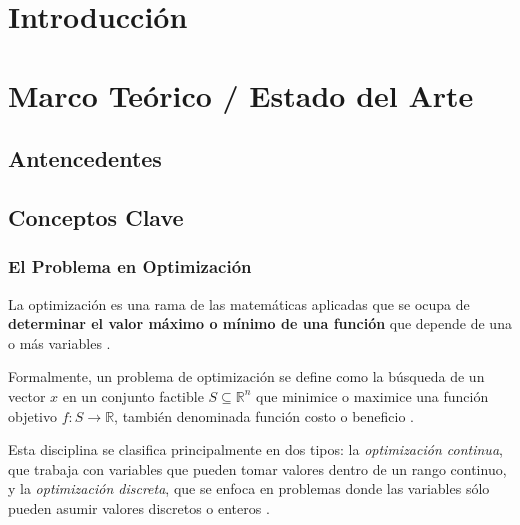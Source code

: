 \documentclass[12pt,titlepage,twoside,openright]{book}
\makeatletter
\def\cleardoublepage{\clearpage\if@twoside \ifodd\c@page\else
\hbox{}
\thispagestyle{empty}
\newpage
\if@twocolumn\hbox{}\newpage\fi\fi\fi}
\makeatother
\begin{document}
\tableofcontents
\cleardoublepage
\listoffigures
\cleardoublepage
\listoftables
\cleardoublepage

\mainmatter
\pagestyle{fancy}
\fancyhf{}
\fancyhead[RO,LE]{\bfseries \thepage}
\fancyhead[LO]{\nouppercase{\rightmark}}
\fancyhead[RE]{\nouppercase{\leftmark}}
\fancyfoot{}

\setlength{\parindent}{0pt}
\setlength{\parskip}{1.5ex}

\chapter{Introducción}
\label{cap:introduccion}

\chapter{Marco Teórico / Estado del Arte}
\label{cap:marco-teorico}
\section{Antencedentes}
\section{Conceptos Clave}
\subsection{El Problema en Optimización}

La optimización es una rama de las matemáticas aplicadas que se ocupa de \textbf{determinar el valor máximo o mínimo de una función} que depende de una o más variables \citep{canek2008}.

Formalmente, un problema de optimización se define como la búsqueda de un vector \( x \) en un conjunto factible \( S \subseteq \mathbb{R}^n \) que minimice o maximice una función objetivo \( f: S \to \mathbb{R} \), también denominada función costo o beneficio \citep{cobos2010}.

Esta disciplina se clasifica principalmente en dos tipos: la \textit{optimización continua}, que trabaja con variables que pueden tomar valores dentro de un rango continuo, y la \textit{optimización discreta}, que se enfoca en problemas donde las variables sólo pueden asumir valores discretos o enteros \citep{cobos2010}.
\end{document}
